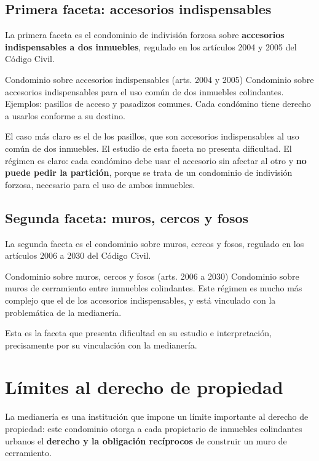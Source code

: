 \documentclass[12pt,oneside]{book}
\begin{document}
\subsection{Primera faceta: accesorios indispensables}

La primera faceta es el condominio de indivisión forzosa sobre \textbf{accesorios indispensables a dos inmuebles}, regulado en los artículos 2004 y 2005 del Código Civil.

\begin{definition}{Condominio sobre accesorios indispensables (arts. 2004 y 2005)}
Condominio sobre accesorios indispensables para el uso común de dos inmuebles colindantes. Ejemplos: pasillos de acceso y pasadizos comunes. Cada condómino tiene derecho a usarlos conforme a su destino.
\end{definition}

El caso más claro es el de los pasillos, que son accesorios indispensables al uso común de dos inmuebles. El estudio de esta faceta no presenta dificultad. El régimen es claro: cada condómino debe usar el accesorio sin afectar al otro y \textbf{no puede pedir la partición}, porque se trata de un condominio de indivisión forzosa, necesario para el uso de ambos inmuebles.

\subsection{Segunda faceta: muros, cercos y fosos}

La segunda faceta es el condominio sobre muros, cercos y fosos, regulado en los artículos 2006 a 2030 del Código Civil.

\begin{definition}{Condominio sobre muros, cercos y fosos (arts. 2006 a 2030)}
Condominio sobre muros de cerramiento entre inmuebles colindantes. Este régimen es mucho más complejo que el de los accesorios indispensables, y está vinculado con la problemática de la medianería.
\end{definition}

Esta es la faceta que presenta dificultad en su estudio e interpretación, precisamente por su vinculación con la medianería.

\section{Límites al derecho de propiedad}

La medianería es una institución que impone un límite importante al derecho de propiedad: este condominio otorga a cada propietario de inmuebles colindantes urbanos el \textbf{derecho y la obligación recíprocos} de construir un muro de cerramiento.
\end{document}
